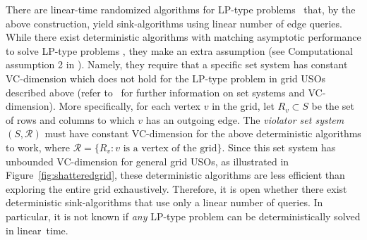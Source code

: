 \documentclass[runningheads,a4paper]{llncs}
\newcommand{\sinkalgs}{sink-algorithms\xspace}
\begin{document}
There are linear-time randomized algorithms for LP-type problems~\cite{MatousekSW96} that, by the above construction, yield \sinkalgs using linear number of edge queries. 
While there exist deterministic algorithms with matching asymptotic performance to solve LP-type problems \cite{chan16,ChazelleM96}, they make an extra assumption  
(see Computational assumption 2 in \cite{ChazelleM96}). 
Namely, they require that a specific set system has constant VC-dimension which does not hold for the LP-type problem in grid USOs described above (refer to~\cite{matouvsek2002lectures} for further information on set systems and VC-dimension). More specifically, for each vertex $v$ in the grid, let $R_v\subset S$ be the set of rows and columns to which $v$ has an outgoing edge. 
The \emph{violator set system} $(S, \mathcal R)$ must have constant VC-dimension for the above deterministic algorithms to work, where $\mathcal R = \{R_v : v\text{ is a vertex of the grid}\}$. 
Since this set system has unbounded VC-dimension for general grid USOs, as illustrated in Figure~\ref{fig:shatteredgrid}, these deterministic algorithms are less efficient than exploring the entire grid exhaustively. 
Therefore, it is open whether there exist deterministic \sinkalgs that use only a linear number of queries. 
In particular, it is not known if \emph{any} LP-type problem can be deterministically solved in linear~time. 
\end{document}
